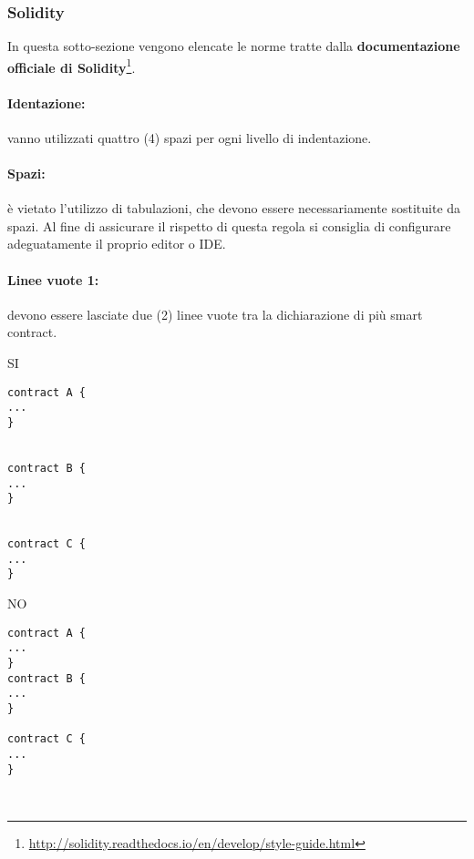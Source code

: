 \documentclass[../processi_primari.tex]{subfiles}
\begin{document}
	
\subsubsection{Solidity}
In questa sotto-sezione vengono elencate le norme tratte dalla \textbf{documentazione officiale di Solidity}\footnote{\href{http://solidity.readthedocs.io/en/develop/style-guide.html}{http://solidity.readthedocs.io/en/develop/style-guide.html}}.

\paragraph*{Identazione: }
vanno utilizzati quattro (4) spazi per ogni livello di indentazione.

\paragraph*{Spazi: }
è vietato l'utilizzo di tabulazioni, che devono essere necessariamente sostituite da spazi. Al fine di assicurare il rispetto di questa regola si consiglia di configurare adeguatamente il proprio editor o IDE.

\paragraph*{Linee vuote 1: }
devono essere lasciate due (2) linee vuote tra la dichiarazione di più smart contract.\\

\begin{minipage}{6cm}
{\begin{center}SI\end{center}}
\begin{Verbatim}[frame=single]
contract A {
...
}


contract B {
...
}


contract C {
...
}
\end{Verbatim}
\end{minipage}
\hfill
\begin{minipage}{6cm}
{\begin{center}NO\end{center}}
\begin{Verbatim}[frame=single]
contract A {
...
}
contract B {
...
}

contract C {
...
}



\end{Verbatim}
\end{minipage}
\end{document}

